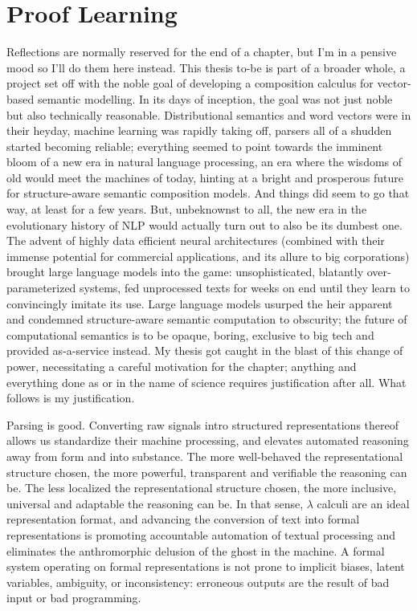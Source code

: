 \chapter{Proof Learning}
\label{chapter:chapter_4}



Reflections are normally reserved for the end of a chapter, but I'm in a pensive mood so I'll do them here instead.
This thesis to-be is part of a broader whole, a project set off with the noble goal of developing a composition calculus for vector-based semantic modelling.
In its days of inception, the goal was not just noble but also technically reasonable.
Distributional semantics and word vectors were in their heyday, machine learning was rapidly taking off, parsers all of a shudden started becoming reliable; everything seemed to point towards the imminent bloom of a new era in natural language processing, an era where the wisdoms of old would meet the machines of today, hinting at a bright and prosperous future for structure-aware semantic composition models.
And things did seem to go that way, at least for a few years.
But, unbeknownst to all, the new era in the evolutionary history of NLP would actually turn out to also be its dumbest one.
The advent of highly data efficient neural architectures (combined with their immense potential for commercial applications, and its allure to big corporations) brought large language models into the game: unsophisticated, blatantly over-parameterized systems, fed unprocessed texts for weeks on end until they learn to convincingly imitate its use.
Large language models usurped the heir apparent and condemned structure-aware semantic computation to obscurity; the future of computational semantics is to be opaque, boring, exclusive to big tech and provided as-a-service instead.
My thesis got caught in the blast of this change of power, necessitating a careful motivation for the chapter; anything and everything done as or in the name of science requires justification after all.
What follows is my justification.

Parsing is good.
Converting raw signals intro structured representations thereof allows us standardize their machine processing, and elevates automated reasoning away from form and into substance.
The more well-behaved the representational structure chosen, the more powerful, transparent and verifiable the reasoning can be.
The less localized the representational structure chosen, the more inclusive, universal and adaptable the reasoning can be.
In that sense, $\lambda$ calculi are an ideal representation format, and advancing the conversion of text into formal representations is promoting accountable automation of textual processing and eliminates the anthromorphic delusion of the ghost in the machine.
A formal system operating on formal representations is not prone to implicit biases, latent variables, ambiguity, or inconsistency: erroneous outputs are the result of bad input or bad programming.

